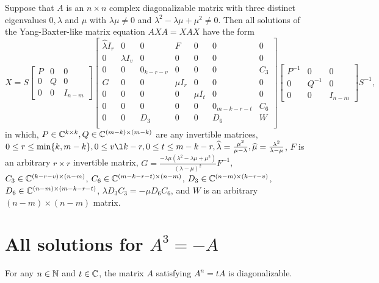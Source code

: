 \documentclass{article}
\begin{document}
\begin{theorem} \label{solutions}
  Suppose that $A$ is an $n \times n$ complex diagonalizable matrix with three distinct eigenvalues $0, \lambda$ and $\mu$ with $\lambda \mu \neq 0$ and $\lambda^2 - \lambda \mu + \mu^2 \neq 0$.
  Then all solutions of the Yang-Baxter-like matrix equation $A X A = X A X$ have the form
  \[X = S \begin{bmatrix} P & 0 & 0\\ 0 & Q & 0\\ 0 & 0 & I_{n - m} \end{bmatrix} \left[ \begin{array}{ccc|ccc|c} \widehat{\lambda} I_r & 0 & 0 & F & 0 & 0 & 0 \\ 0 & \lambda I_v & 0 & 0 & 0 & 0 & 0 \\ 0 & 0 & 0_{k - r - v} & 0 & 0 & 0 & C_3 \\ \hline G & 0 & 0 & \widehat{\mu} I_r & 0 & 0 & 0 \\ 0 & 0 & 0 & 0 & \mu I_t & 0 & 0 \\ 0 & 0 & 0 & 0 & 0 & 0_{m - k - r - t} & C_6 \\ \hline 0 & 0 & D_3 & 0 & 0 & D_6 & W \\ \end{array} \right] \begin{bmatrix} P^{-1} & 0 & 0\\ 0 & Q^{-1} & 0\\ 0 & 0 & I_{n - m} \end{bmatrix} S^{-1},\]
  in which, $P \in \mathbb{C}^{k \times k}, Q \in \mathbb{C}^{(m - k) \times (m - k)}$ are any invertible matrices, $0 \le r \le \min \{k, m - k\}, 0 \le v \l k - r, 0 \le t \le m - k - r, \widehat{\lambda} = \frac{\mu^2}{\mu - \lambda}, \widehat{\mu} = \frac{\lambda^2}{\lambda - \mu}$, $F$ is an arbitrary $r \times r$ invertible matrix, $G = \frac{- \lambda \mu (\lambda^2 - \lambda \mu + \mu^2)}{(\lambda - \mu)^2} F^{-1}$, $C_3 \in \mathbb{C}^{(k - r - v) \times (n - m)}$, $C_6 \in \mathbb{C}^{(m - k - r - t) \times (n - m)}$, $D_3 \in \mathbb{C}^{(n - m) \times (k - r - v)}$, $D_6 \in \mathbb{C}^{(n - m) \times (m - k - r - t)}$, $\lambda D_3 C_3 = - \mu D_6 C_6$, and $W$ is an arbitrary $(n - m) \times (n - m)$ matrix.
\end{theorem}

\section{All solutions for $A^3 = -A$}

\begin{theorem} \label{periodic-diagonal}
  For any $n \in \mathbb{N}$ and $t \in \mathbb{C}$, the matrix $A$ satisfying $A^n = t A$ is diagonalizable.
\end{theorem}
\end{document}
